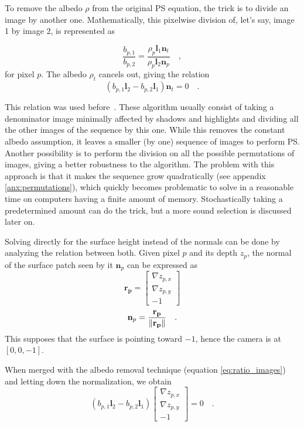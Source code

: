 To remove the albedo $\rho$ from the original PS equation, the trick is to divide an image by another one. Mathematically, this pixelwise division of, let's say, image 1 by image 2, is represented as

\begin{equation}
\frac{b_{p,1}}{b_{p,2}} = \frac{\rho_p \mathbf{l}_1 \mathbf{n}_t}{\rho_p \mathbf{l}_2 \mathbf{n}_p} \quad,
\end{equation}
for pixel $p$. The albedo $\rho_t$ cancels out, giving the relation
\begin{equation}
\label{eq:ratio_images}
\left( b_{p,1} \mathbf{l}_2 - b_{p,2} \mathbf{l}_1 \right) \mathbf{n}_t = 0  \quad.
\end{equation}

This relation was used before~\cite{yu-iccp-13,wu-pami-06}. These algorithm usually consist of taking a denominator image minimally affected by shadows and highlights and dividing all the other images of the sequence by this one. While this removes the constant albedo assumption, it leaves a smaller (by one) sequence of images to perform PS. Another possibility is to perform the division on all the possible permutations of images, giving a better robustness to the algorithm. The problem with this approach is that it makes the sequence grow quadratically (see appendix \ref{anx:permutations}), which quickly becomes problematic to solve in a reasonable time on computers having a finite amount of memory. Stochastically taking a predetermined amount can do the trick, but a more sound selection is discussed later on.
 
Solving directly for the surface height instead of the normals can be done by analyzing the relation between both. Given pixel $p$ and its depth $z_p$, the normal of the surface patch seen by it $\mathbf{n}_p$ can be expressed as
\begin{equation}
\mathbf{r_p} = 
\begin{bmatrix}
\nabla z_{p,x} \\
\nabla z_{p,y} \\
-1
\end{bmatrix}
\end{equation}
\begin{equation}
\mathbf{n}_p =
\frac{\mathbf{r_p}}{\left\lVert\mathbf{r_p}\right\rVert} \quad.
\end{equation}
This supposes that the surface is pointing toward $-1$, hence the camera is at $[0, 0, -1]$.

When merged with the albedo removal technique (equation \eqref{eq:ratio_images}) and letting down the normalization, we obtain
\begin{equation}
\label{eq:pre-dlt}
\left( b_{p,1} \mathbf{l}_2 - b_{p,2} \mathbf{l}_1 \right)
\begin{bmatrix}
\nabla z_{p,x} \\
\nabla z_{p,y} \\
-1
\end{bmatrix}
= 0  \quad.
\end{equation}

